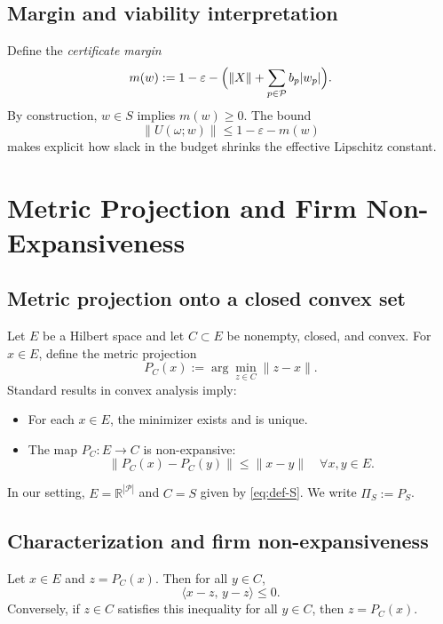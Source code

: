 \documentclass[11pt]{article}
\begin{document}
\subsection{Margin and viability interpretation}

Define the \emph{certificate margin}
\begin{equation}
  m(w) := 1 - \varepsilon - \Bigl(\|X\| + \sum_{p\in\mathcal P} b_p |w_p|\Bigr).
  \label{eq:margin-def}
\end{equation}
By construction, $w\in S$ implies $m(w)\ge 0$. The bound
\[
\|U(\omega;w)\|\le 1-\varepsilon - m(w)
\]
makes explicit how slack in the budget shrinks the effective Lipschitz constant.

\section{Metric Projection and Firm Non-Expansiveness}

\subsection{Metric projection onto a closed convex set}

Let $E$ be a Hilbert space and let $C\subset E$ be nonempty, closed, and convex. For $x\in E$, define the metric projection
\[
P_C(x) := \arg\min_{z\in C}\|z-x\|.
\]
Standard results in convex analysis imply:
\begin{itemize}
  \item For each $x\in E$, the minimizer exists and is unique.
  \item The map $P_C:E\to C$ is non-expansive:
  \[
    \|P_C(x)-P_C(y)\| \le \|x-y\|\quad\forall x,y\in E.
  \]
\end{itemize}

In our setting, $E = \mathbb R^{|\mathcal P|}$ and $C=S$ given by \eqref{eq:def-S}. We write $\Pi_S := P_S$.

\subsection{Characterization and firm non-expansiveness}

\begin{lemma}[Characterization of $P_C$]\label{lem:projection-characterization}
Let $x\in E$ and $z=P_C(x)$. Then for all $y\in C$,
\[
\langle x - z,\, y - z\rangle \le 0.
\]
Conversely, if $z\in C$ satisfies this inequality for all $y\in C$, then $z = P_C(x)$.
\end{lemma}
\end{document}
